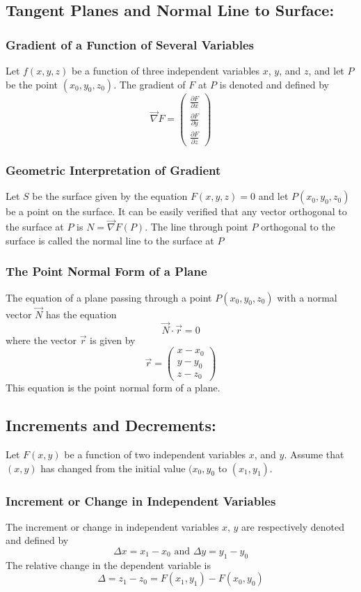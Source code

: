 \documentclass[14pt]{article}
\begin{document}
    \subsection{Tangent Planes and Normal Line to Surface:}
    \subsubsection{Gradient of a Function of Several Variables}
    Let $f(x,y,z)$ be a function of three independent variables $x$,
    $y$, and $z$, and let $P$ be the point $(x_0, y_0, z_0)$. The
    gradient of $F$ at $P$ is denoted and defined by
    $$\vec\nabla F=\begin{pmatrix} \frac{\partial F}{\partial x}\\
        \frac{\partial F}{\partial y}\\
        \frac{\partial F}{\partial z}
    \end{pmatrix}$$
    \subsubsection{Geometric Interpretation of Gradient}
    Let $S$ be the surface given by the equation $F(x,y,z)=0$ and let
    $P(x_0, y_0, z_0)$ be a point on the surface. It can be easily
    verified that any vector orthogonal to the surface at $P$ is $N=\vec
    \nabla F(P)$. The line through point $P$ orthogonal to the surface
    is called the normal line to the surface at $P$
    \subsubsection{The Point Normal Form of a Plane}
    The equation of  a plane passing through a point $P(x_0, y_0, z_0)$
    with a normal vector $\vec N$ has the equation
    $$\vec N\cdot \vec r=0$$ where the vector $\vec r$ is given by
    $$\vec r=\begin{pmatrix} x-x_0\\
        y-y_0\\
        z-z_0 \end{pmatrix}$$ This equation is the point normal form of
    a plane.
    \subsection{Increments and Decrements:}
    Let $F(x,y)$ be a function of two independent variables $x$, and
    $y$. Assume that $(x,y)$ has changed from the initial value $(x_0,
    y_0$ to $(x_1, y_1)$. 
    \subsubsection{Increment or Change in Independent Variables}
    The increment or change in independent variables $x$, $y$ are
    respectively denoted and defined by
    $$\Delta x=x_1-x_0\text{ and }\Delta y=y_1-y_0$$ The relative change
    in the dependent variable is
    $$\Delta=z_1-z_0=F(x_1, y_1)-F(x_0, y_0)$$
\end{document}

